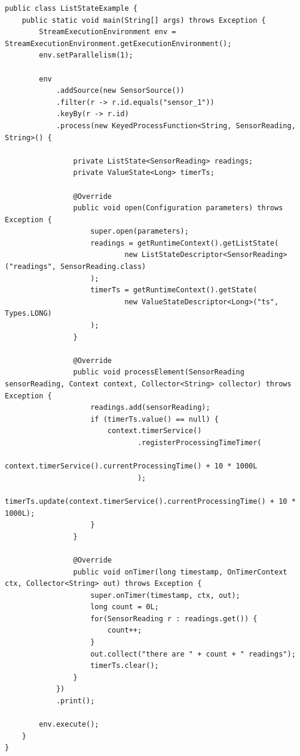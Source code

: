 \documentclass[cn,11pt,chinese]{elegantbook}
\begin{document}
\begin{verbatim}
public class ListStateExample {
    public static void main(String[] args) throws Exception {
        StreamExecutionEnvironment env = StreamExecutionEnvironment.getExecutionEnvironment();
        env.setParallelism(1);

        env
            .addSource(new SensorSource())
            .filter(r -> r.id.equals("sensor_1"))
            .keyBy(r -> r.id)
            .process(new KeyedProcessFunction<String, SensorReading, String>() {

                private ListState<SensorReading> readings;
                private ValueState<Long> timerTs;

                @Override
                public void open(Configuration parameters) throws Exception {
                    super.open(parameters);
                    readings = getRuntimeContext().getListState(
                            new ListStateDescriptor<SensorReading>("readings", SensorReading.class)
                    );
                    timerTs = getRuntimeContext().getState(
                            new ValueStateDescriptor<Long>("ts", Types.LONG)
                    );
                }

                @Override
                public void processElement(SensorReading sensorReading, Context context, Collector<String> collector) throws Exception {
                    readings.add(sensorReading);
                    if (timerTs.value() == null) {
                        context.timerService()
                               .registerProcessingTimeTimer(
                                   context.timerService().currentProcessingTime() + 10 * 1000L
                               );
                        timerTs.update(context.timerService().currentProcessingTime() + 10 * 1000L);
                    }
                }

                @Override
                public void onTimer(long timestamp, OnTimerContext ctx, Collector<String> out) throws Exception {
                    super.onTimer(timestamp, ctx, out);
                    long count = 0L;
                    for(SensorReading r : readings.get()) {
                        count++;
                    }
                    out.collect("there are " + count + " readings");
                    timerTs.clear();
                }
            })
            .print();

        env.execute();
    }
}
\end{verbatim}
\end{document}
